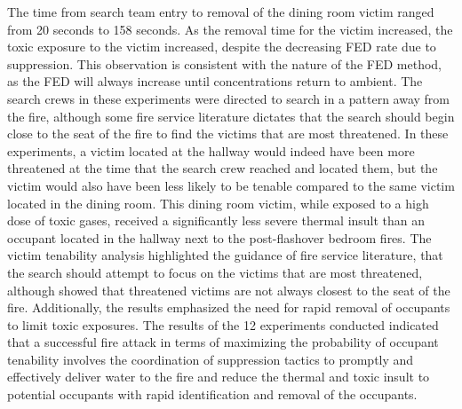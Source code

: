 \documentclass[12pt,oneside]{article}
\begin{document}
The time from search team entry to removal of the dining room victim ranged from 20 seconds to 158 seconds.  As the removal time for the victim increased, the toxic exposure to the victim increased, despite the decreasing FED rate due to suppression. This observation is consistent with the nature of the FED method, as the FED will always increase until concentrations return to ambient. The search crews in these experiments were directed to search in a pattern away from the fire, although some fire service literature dictates that the search should begin close to the seat of the fire to find the victims that are most threatened. In these experiments, a victim located at the hallway would indeed have been more threatened at the time that the search crew reached and located them, but the victim would also have been less likely to be tenable compared to the same victim located in the dining room. This dining room victim, while exposed to a high dose of toxic gases, received a significantly less severe thermal insult than an occupant located in the hallway next to the post-flashover bedroom fires. The victim tenability analysis highlighted the guidance of fire service literature, that the search should attempt to focus on the victims that are most threatened, although showed that threatened victims are not always closest to the seat of the fire. Additionally, the results emphasized the need for rapid removal of occupants to limit toxic exposures. The results of the 12 experiments conducted indicated that a successful fire attack in terms of maximizing the probability of occupant tenability involves the coordination of suppression tactics to promptly and effectively deliver water to the fire and reduce the thermal and toxic insult to potential occupants with rapid identification and removal of the occupants. 



\end{document}
